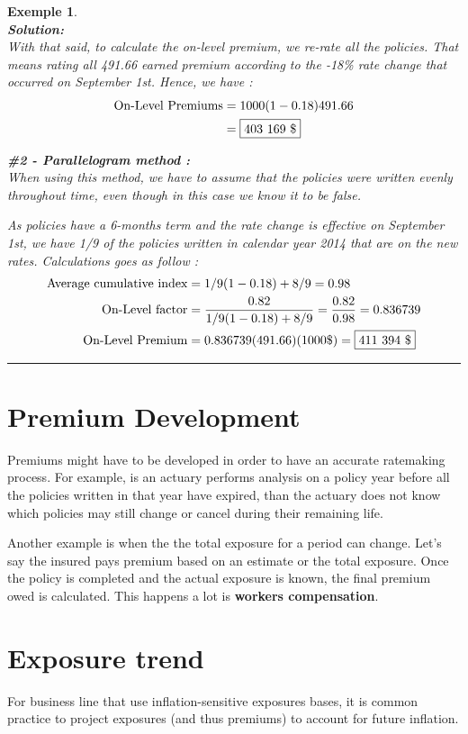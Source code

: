 \documentclass[11pt, english]{memoir}
\numberwithin{definition}{section}
\newtheorem{example}{Exemple}[section]
\newenvironment{exemple}
{
	\begin{example} \normalfont \ \\ 
	}
	{
		\hfill\rule{0.5em}{0.5em}\end{example}
}
\newenvironment{solution}
{\noindent\textbf{Solution:} \\ 
}{
}
\begin{document}
\begin{exemple}
\begin{solution}
			With that said, to calculate the on-level premium, we re-rate all the policies. That means rating all 491.66 earned premium according to the -18\% rate change that occurred on September 1st. Hence, we have : 
			\begin{align*}
			\text{On-Level Premiums} &= 1000(1-0.18)491.66\\
			&=\fbox{403 169 \$}
			\end{align*} 
			
		\textbf{\#2 - Parallelogram method : } \\[0pt]
			When using this method, we have to assume that the policies were written evenly throughout time, even though in this case we know it to be false. 
			
			As policies have a 6-months term and the rate change is effective on September 1st, we have 1/9 of the policies written in calendar year 2014 that are on the new rates. Calculations goes as follow : 
			\begin{align*}
			\text{Average cumulative index} &= 1/9(1-0.18) + 8/9 = 0.98\\
			\text{On-Level factor} &= \frac{0.82}{1/9(1-0.18) + 8/9} = \frac{0.82}{0.98} = 0.836739\\
			\text{On-Level Premium} &= 0.836739(491.66)(1000\$) = \fbox{411 394 \$}
			\end{align*}
	\end{solution}
	\end{exemple}
	
	\section{Premium Development}
	Premiums might have to be developed in order to have an accurate ratemaking process. For example, is an actuary performs analysis on a policy year before all the policies written in that year have expired, than the actuary does not know which policies may still change or cancel during their remaining life. 
	
	Another example is when the the total exposure for a period can change. Let's say the insured pays premium based on an estimate or the total exposure. Once the policy is completed and the actual exposure is known, the final premium owed is calculated. This happens a lot is \textbf{workers compensation}. 
	
	\section{Exposure trend}
	For business line that use inflation-sensitive exposures bases, it is common practice to project exposures (and thus premiums) to account for future inflation. 
	
\end{document}
